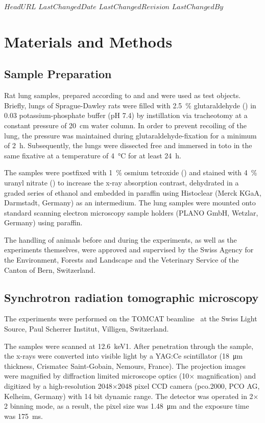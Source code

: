 \svnidlong
{$HeadURL$}
{$LastChangedDate$}
{$LastChangedRevision$}
{$LastChangedBy$}
%
\section{Materials and Methods}
\label{sec:materials and methods}
\subsection{Sample Preparation}
Rat lung samples, prepared according to
\ifhtml
	\citet{Tschanz2002} and \citet{Luyet2002}
\else
	 and 
\fi
were used as test objects. Briefly, lungs of Sprague-Dawley rats were filled with \SI{2.5}{\percent} glutaraldehyde () in \SI{0.03}{\Molar} potassium-phosphate buffer (pH 7.4) by instillation via tracheotomy at a constant pressure of \SI{20}{\centi\meter} water column. In order to prevent recoiling of the lung, the pressure was maintained during glutaraldehyde-fixation for a minimum of \SI{2}{\hour}. Subsequently, the lungs were dissected free and immersed in toto in the same fixative at a temperature of \SI{4}{\celsius} for at least \SI{24}{\hour}.

The samples were postfixed with \SI{1}{\percent} osmium tetroxide () and stained with \SI{4}{\percent} uranyl nitrate () to increase the x-ray absorption contrast, dehydrated in a graded series of ethanol and embedded in paraffin using Histoclear (Merck KGaA, Darmstadt, Germany) as an intermedium. The lung samples were mounted onto standard scanning electron microscopy sample holders (PLANO GmbH, Wetzlar, Germany) using paraffin.

The handling of animals before and during the experiments, as well as the experiments themselves, were approved and supervised by the Swiss Agency for the Environment, Forests and Landscape and the Veterinary Service of the Canton of Bern, Switzerland.

\subsection{Synchrotron radiation tomographic microscopy}
The experiments were performed on the TOMCAT beamline~\cite{Stampanoni2006a} at the Swiss Light Source, Paul Scherrer Institut, Villigen, Switzerland.

The samples were scanned at \SI{12.6}{\kilo\electronvolt}1. After penetration through the sample, the x-rays were converted into visible light by a YAG:Ce scintillator (\SI{18}{\micro\meter} thickness, Crismatec Saint-Gobain, Nemours, France). The projection images were magnified by diffraction limited microscope optics (10$\times$ magnification) and digitized by a high-resolution 2048$\times$2048 pixel CCD camera (pco.2000, PCO AG, Kelheim, Germany) with 14 bit dynamic range. The detector was operated in 2$\times$2 binning mode, as a result, the pixel size was \SI{1.48}{\micro\meter} and the exposure time was \SI{175}{\milli\second}.

